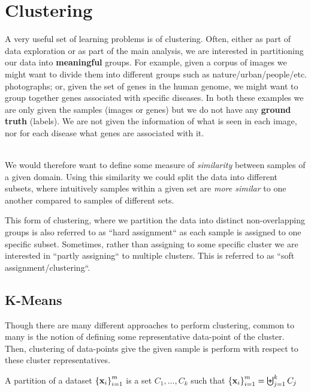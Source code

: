 


\section{Clustering}
A very useful set of learning problems is of clustering. Often, either as part of data exploration or as part of the main analysis, we are interested in partitioning our data into \textbf{meaningful} groups. For example, given a corpus of images we might want to divide them into different groups such as nature/urban/people/etc. photographs; or, given the set of genes in the human genome, we might want to group together genes associated with specific diseases. In both these examples we are only given the samples (images or genes) but we do not have any \textbf{ground truth} (labels). We are not given the information of what is seen in each image, nor for each disease what genes are associated with it. 

~\\We would therefore want to define some measure of \textit{similarity} between samples of a given domain. Using this similarity we could split the data into different subsets, where intuitively samples within a given set are \textit{more similar} to one another compared to samples of different sets.

\begin{remark}
This form of clustering, where we partition the data into distinct non-overlapping groups is also referred to as ``hard assignment`` as each sample is assigned to one specific subset. Sometimes, rather than assigning to some specific cluster we are interested in ``partly assigning`` to multiple clusters. This is referred to as ``soft assignment/clustering``.
\end{remark}

\subsection{K-Means}
Though there are many different approaches to perform clustering, common to many is the notion of defining some representative data-point of the cluster. Then, clustering of data-points give the given sample is perform with respect to these cluster representatives.

\begin{definition}
A partition of a dataset $\left\{\mathbf{x}_i\right\}_{i=1}^m$ is a set $C_1,\ldots,C_k$ such that $\left\{\mathbf{x}_i\right\}_{i=1}^m = \biguplus_{j=1}^k C_j$
\end{definition}

